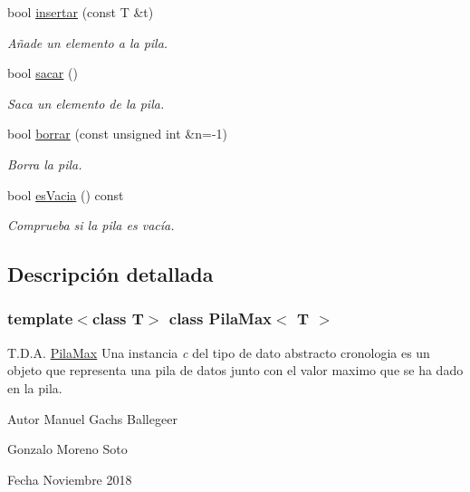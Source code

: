 \begin{DoxyCompactItemize}
bool \mbox{\hyperlink{classPilaMax_a7569c21e5cd32d277f9f777209e2c67d}{insertar}} (const T \&t)
\begin{DoxyCompactList}\small\item\em Añade un elemento a la pila. \end{DoxyCompactList}\item 
bool \mbox{\hyperlink{classPilaMax_a822a83071b786c454dc293635006e9ec}{sacar}} ()
\begin{DoxyCompactList}\small\item\em Saca un elemento de la pila. \end{DoxyCompactList}\item 
bool \mbox{\hyperlink{classPilaMax_a2930d3f8ffd449ca8653c8dce8694917}{borrar}} (const unsigned int \&n=-\/1)
\begin{DoxyCompactList}\small\item\em Borra la pila. \end{DoxyCompactList}\item 
bool \mbox{\hyperlink{classPilaMax_a41161f09d76d8e2851ff9424ced9bc68}{es\+Vacia}} () const
\begin{DoxyCompactList}\small\item\em Comprueba si la pila es vacía. \end{DoxyCompactList}\end{DoxyCompactItemize}


\subsection{Descripción detallada}
\subsubsection*{template$<$class T$>$\newline
class Pila\+Max$<$ T $>$}

T.\+D.\+A. \mbox{\hyperlink{classPilaMax}{Pila\+Max}} Una instancia {\itshape c} del tipo de dato abstracto {\ttfamily cronologia} es un objeto que representa una pila de datos junto con el valor maximo que se ha dado en la pila. 

\begin{DoxyAuthor}{Autor}
Manuel Gachs Ballegeer 

Gonzalo Moreno Soto 
\end{DoxyAuthor}
\begin{DoxyDate}{Fecha}
Noviembre 2018 
\end{DoxyDate}


